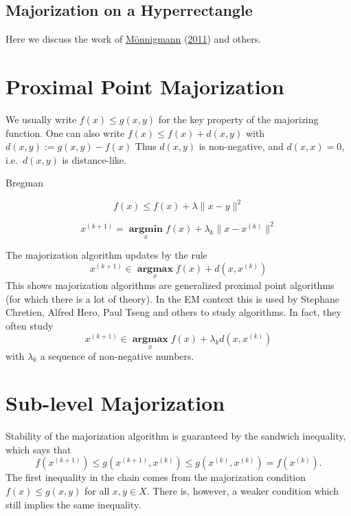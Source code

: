 \documentclass[
  12pt,
]{book}
\begin{document}
\hypertarget{majorization-on-a-hyperrectangle}{%
\subsection{Majorization on a Hyperrectangle}\label{majorization-on-a-hyperrectangle}}

Here we discuss the work of \protect\hyperlink{ref-monnigmann_11}{Mönnigmann} (\protect\hyperlink{ref-monnigmann_11}{2011}) and others.

\hypertarget{proximal-point-majorization}{%
\section{Proximal Point Majorization}\label{proximal-point-majorization}}

We usually write
\(f(x) \leq g(x,y)\)
for the key property of the majorizing function. One can also write
\(f(x) \leq f(x) + d(x, y)\)
with
\(d(x, y):=g(x, y)-f(x)\)
Thus \(d(x,y)\) is non-negative, and \(d(x,x)=0\), i.e.~\(d(x,y)\) is distance-like.

Bregman

\[
f(x)\leq f(x)+\lambda\|x-y\|^2
\]

\[
x^{(k+1)}=\mathop{\mathbf{argmin}}\limits_{x} f(x)+\lambda_k\|x-x^{(k)}\|^2
\]

The majorization algorithm updates by the rule
\[
x^{(k+1)}\in\mathop{\mathbf{argmax}}\limits_{x} f(x)+d(x,x^{(k)})
\]
This shows majorization algorithms are generalized proximal point
algorithms (for which there is a lot of theory). In the EM context this is used by Stephane Chretien, Alfred Hero, Paul Tseng and others to study algorithms. In fact, they often study
\[
x^{(k+1)}\in\mathop{\mathbf{argmax}}\limits_{x} f(x)+\lambda_kd(x,x^{(k)})
\]
with \(\lambda_k\) a sequence of non-negative numbers.

\hypertarget{sub-level-majorization}{%
\section{Sub-level Majorization}\label{sub-level-majorization}}

Stability of the majorization algorithm is guaranteed by the sandwich inequality, which says that
\[
f(x^{(k+1)})\leq g(x^{(k+1)},x^{(k)})\leq g(x^{(k)},x^{(k)})=f(x^{(k)}).
\]
The first inequality in the chain comes from the majorization condition \(f(x)\leq g(x,y)\) for all \(x,y\in X\). There is, however, a weaker condition which still implies the same inequality.
\end{document}
